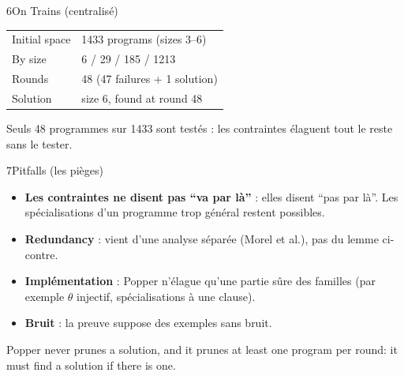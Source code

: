 \documentclass[10pt]{article}
\begin{document}
\begin{minipage}[t]{0.52\textwidth}
\begin{bloc}{\num{6}On Trains (centralisé)}
{\scriptsize
\renewcommand{\arraystretch}{1.1}
\begin{tabular}{@{}l l@{}}
Initial space & 1433 programs (sizes 3--6)\\
By size & 6 / 29 / 185 / 1213\\
Rounds & 48 (47 failures + 1 solution)\\
Solution & size 6, found at round 48\\
\end{tabular}}\par\vspace{2pt}
\footnotesize Seuls 48 programmes sur 1433 sont testés : les contraintes élaguent tout le reste sans le tester.
\end{bloc}
\end{minipage}\hfill
\begin{minipage}[t]{0.46\textwidth}
\begin{bloc}{\num{7}Pitfalls (les pièges)}
\begin{itemize}
  \item \textbf{Les contraintes ne disent pas ``va par là''} : elles disent ``pas par là''. Les spécialisations d'un programme trop général restent possibles.
  \item \textbf{Redundancy} : vient d'une analyse séparée (Morel et al.), pas du lemme ci-contre.
  \item \textbf{Implémentation} : Popper n'élague qu'une partie sûre des familles (par exemple $\theta$ injectif, spécialisations à une clause).
  \item \textbf{Bruit} : la preuve suppose des exemples sans bruit.
\end{itemize}
\end{bloc}
\end{minipage}

\vspace{5pt}

\begin{tcolorbox}[colback=marine, colframe=marine, arc=0pt, boxrule=0pt,
  halign=center, top=3pt, bottom=3pt]
\color{white}\small Popper never prunes a solution, and it prunes at least one program per round: it must find a solution if there is one.
\end{tcolorbox}

\detailpages
\end{document}
